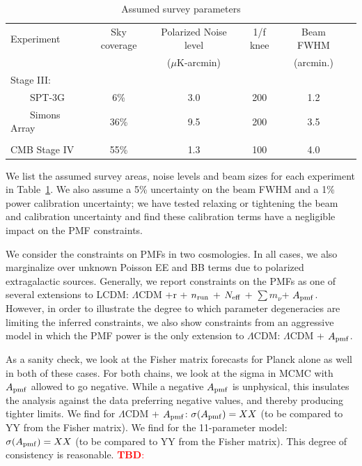 \documentclass[preprint]{emulateapj}
\newcommand{\apmf}{\ensuremath{A_{\rm pmf}}}
\newcommand{\lcdm}{\ensuremath{\Lambda}CDM}
\newcommand{\nrun}{\ensuremath{n_{\rm run}}}
\newcommand{\neff}{\ensuremath{N_{\rm eff}}}
\newcommand{\mnu}{\ensuremath{\sum m_\nu}}
\newcommand{\tbd}[1]{\textcolor{Red}{{\bf TBD}: #1}}
\begin{document}
\begin{table}[h]
\begin{center}
\caption{\label{tab:experiments} Assumed survey parameters}
\small
\begin{tabular}{l || c c c c c }
Experiment & Sky coverage & Polarized Noise level  & 1/f knee & Beam FWHM \\
& &($\mu$K-arcmin)&&(arcmin.)\\
\hline
Stage III: & & & & \\

~~~~SPT-3G & 6\% & 3.0 & 200 & 1.2 \\
~~~~Simons Array & 36\% & 9.5 & 200 & 3.5 \\ 
\\
CMB Stage IV & 55\% & 1.3 & 100 & 4.0 \\
\end{tabular}
 \normalsize
\end{center}
\end{table}


We list the assumed survey areas, noise levels and beam sizes for each experiment in Table~\ref{tab:experiments}. 
We also assume a 5\% uncertainty on the beam FWHM and a 1\% power calibration uncertainty; we have tested relaxing or tightening the beam and calibration uncertainty and find these calibration terms have a negligible impact on the PMF constraints. 


We consider the constraints on PMFs in two cosmologies. 
In all cases, we also marginalize over unknown Poisson EE and BB  terms due to polarized extragalactic sources. 
Generally, we report constraints on the PMFs as one of several extensions to LCDM:  \lcdm{}  +r + \nrun{} + \neff{} + \mnu{}+ \apmf. 
However, in order to illustrate the degree to which parameter degeneracies are limiting the inferred constraints,  we also show constraints from an aggressive model in which the PMF power is the only extension to \lcdm{}:  \lcdm{}  + \apmf. 

As a sanity check, we look at the Fisher matrix forecasts for Planck alone as well in both of these cases. 
For both chains,  we look at the sigma in MCMC with \apmf{} allowed to go negative. 
While a negative \apmf{} is unphysical, this insulates the analysis against the data preferring negative values, and thereby producing tighter limits. 
We find for \lcdm{}  + \apmf{}: $\sigma(\apmf) = XX$ (to be compared to YY from the Fisher matrix). 
We find for the 11-parameter model: $\sigma(\apmf) = XX$ (to be compared to YY from the Fisher matrix). 
This degree of consistency is reasonable. \tbd{}
\end{document}
